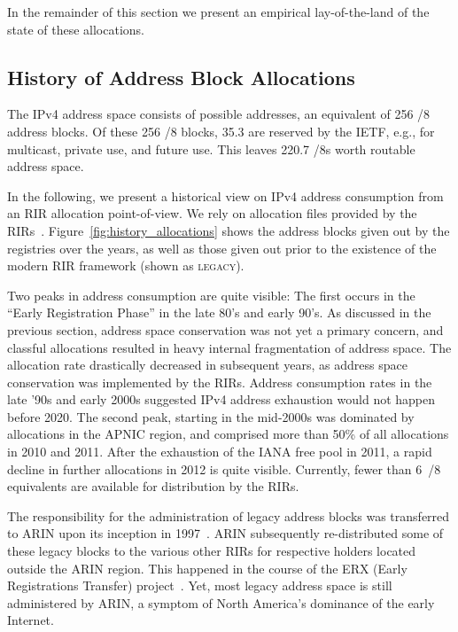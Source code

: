 \documentclass[letter]{sigcomm-alternate}
\begin{document}
In the remainder of this section we present an empirical lay-of-the-land
of the state of these allocations.

\subsection{History of Address Block Allocations}

The IPv4 address space consists of  possible addresses, an equivalent
of 256 /8 address blocks. Of these 256 /8 blocks, 35.3 are reserved by the
IETF, e.g., for multicast, private use, and future use. This leaves
220.7 /8s worth routable address space.

In the following, we present a historical view on IPv4 address consumption 
from an RIR allocation point-of-view.  We rely on allocation files
provided by the RIRs~\cite{nro_files}. Figure~\ref{fig:history_allocations}
shows the address blocks given out by the registries over the years, as well as 
those given out prior to the existence of the modern RIR framework (shown as 
\textsc{legacy}).

Two peaks in address consumption are quite visible: The first 
occurs in the ``Early Registration Phase'' in the late 80's and early 90's. As
discussed in the previous section, address space conservation was not yet a
primary concern, and classful allocations resulted in heavy internal
fragmentation of address space.  The allocation rate drastically decreased in 
subsequent years, as address space conservation was implemented by the
RIRs. Address consumption rates in the late '90s and early 2000s suggested 
IPv4 address exhaustion would not happen  before 2020. The second peak, starting in 
the mid-2000s was dominated by allocations in the APNIC region, and comprised 
more than 50\% of all allocations in 2010 and 2011. After the 
exhaustion of the IANA free pool in 2011, a rapid decline in further allocations 
in 2012 is quite visible. Currently, fewer than 6~/8 equivalents are 
available for distribution by the RIRs.

The responsibility for the administration of legacy address blocks was 
transferred to ARIN upon its inception in 1997~\cite{nsi_arin_handover}. ARIN 
subsequently re-distributed some of these legacy blocks to the various other 
RIRs for respective holders located outside the ARIN region. This happened in 
the course of the ERX (Early Registrations Transfer) project~\cite{ripe_erx}. 
Yet, most legacy address space is still administered by ARIN, a symptom of North
America's dominance of the early Internet.
\end{document}
